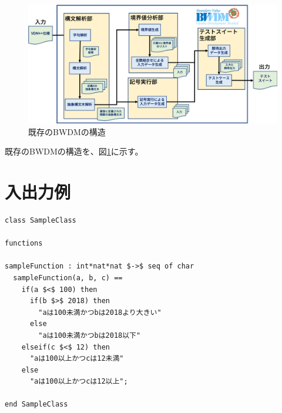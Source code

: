 \documentclass[uplatex, report, a4j, 10pt]{jsbook}
\begin{document}
\begin{figure}[tp]
  \centering
  \includegraphics[keepaspectratio, width=160mm]{figs/exist_bwdm_structure.png}
  \caption{既存のBWDMの構造}
  \label{fig:existBwdmStructure}
\end{figure}

既存のBWDMの構造を、図\ref{fig:existBwdmStructure}に示す。

\section{入出力例}

\lstset{language=}
\noindent\begin{minipage}{\textwidth}
  \begin{lstlisting}[caption=入力例：VDM++仕様,label=fig:input_sample]
class SampleClass

functions

sampleFunction : int*nat*nat $->$ seq of char
  sampleFunction(a, b, c) == 
    if(a $<$ 100) then
      if(b $>$ 2018) then
        "aは100未満かつbは2018より大きい"
      else
        "aは100未満かつbは2018以下"
    elseif(c $<$ 12) then
      "aは100以上かつcは12未満"
    else
      "aは100以上かつcは12以上";

end SampleClass

\end{lstlisting}
\end{minipage}
\end{document}
